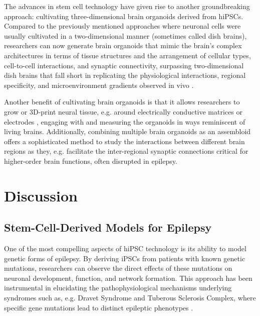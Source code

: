 \documentclass[10pt]{article}
\begin{document}
\begin{sloppypar}
  The advances in stem cell technology have given rise to another groundbreaking approach: cultivating three-dimensional brain organoids derived from hiPSCs. Compared to the previously mentioned approaches where neuronal cells were usually cultivated in a two-dimensional manner (sometimes called dish brains), researchers can now generate brain organoids that mimic the brain’s complex architectures in terms of tissue structures and the arrangement of cellular types, cell-to-cell interactions, and synaptic connectivity, surpassing two-dimensional dish brains that fall short in replicating the physiological interactions, regional specificity, and microenvironment gradients observed in vivo \citep{clevers_modeling_2016, wang_modeling_2018}.

  Another benefit of cultivating brain organoids is that it allows researchers to grow or 3D-print neural tissue, e.g. around electrically conductive matrices or electrodes \citep{yao_3d_2023}, engaging with and measuring the organoids in ways reminiscent of living brains. Additionally, combining multiple brain organoids as an assembloid offers a sophisticated method to study the interactions between different brain regions \citep{sloan_generation_2018} as they, e.g. facilitate the inter-regional synaptic connections critical for higher-order brain functions, often disrupted in epilepsy.

  \section{Discussion}
  \label{sec:discussion}


  \subsection{Stem-Cell-Derived Models for Epilepsy}
  \label{sec:stem-cell-derived-models-for-epilepsy}

  One of the most compelling aspects of hiPSC technology is its ability to model genetic forms of epilepsy. By deriving iPSCs from patients with known genetic mutations, researchers can observe the direct effects of these mutations on neuronal development, function, and network formation. This approach has been instrumental in elucidating the pathophysiological mechanisms underlying syndromes such as, e.g. Dravet Syndrome and Tuberous Sclerosis Complex, where specific gene mutations lead to distinct epileptic phenotypes \citep{jiao_modeling_2013, nadadhur_neuron-glia_2019}.


\end{sloppypar}
\end{document}
